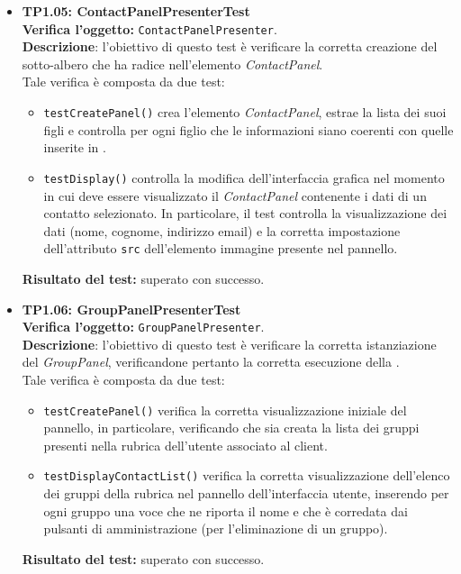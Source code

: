 \begin{itemize}
\item \textbf{TP1.05: ContactPanelPresenterTest}\\
\textbf{Verifica l'oggetto:} \texttt{ContactPanelPresenter}.\\
\textbf{Descrizione}: l'obiettivo di questo test è verificare la corretta creazione del sotto-albero che ha radice nell'elemento \textit{ContactPanel}.\\
Tale verifica è composta da due test:
\begin{itemize}
\item \texttt{testCreatePanel()} crea l'elemento \textit{ContactPanel}, estrae la lista dei suoi figli e controlla per ogni figlio che le informazioni siano coerenti con quelle inserite in .
\item \texttt{testDisplay()} controlla la modifica dell'interfaccia grafica nel momento in cui deve essere visualizzato il \textit{ContactPanel} contenente i dati di un contatto selezionato. In particolare, il test controlla la visualizzazione dei dati (nome, cognome, indirizzo email) e la corretta impostazione dell'attributo \texttt{src} dell'elemento immagine presente nel pannello.
\end{itemize}
\textbf{Risultato del test:} superato con successo.

\item \textbf{TP1.06: GroupPanelPresenterTest}\\
\textbf{Verifica l'oggetto:} \texttt{GroupPanelPresenter}.\\
\textbf{Descrizione}: l'obiettivo di questo test è verificare la corretta istanziazione del \textit{GroupPanel}, verificandone pertanto la corretta esecuzione della .\\
Tale verifica è composta da due test:
\begin{itemize}
\item \texttt{testCreatePanel()} verifica la corretta visualizzazione iniziale del pannello, in particolare, verificando che sia creata la lista dei gruppi presenti nella rubrica dell'utente associato al client.
\item \texttt{testDisplayContactList()} verifica la corretta visualizzazione dell'elenco dei gruppi della rubrica nel pannello dell'interfaccia utente, inserendo per ogni gruppo una voce che ne riporta il nome e che è corredata dai pulsanti di amministrazione (per l'eliminazione di un gruppo).
\end{itemize}
\textbf{Risultato del test:} superato con successo.


\end{itemize}
